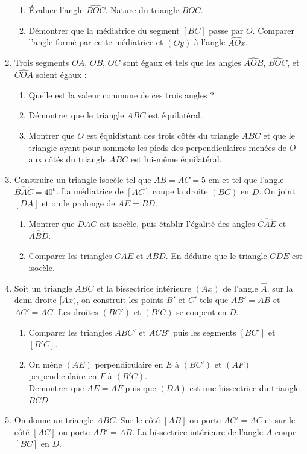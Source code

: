 \begin{enumerate}
\begin{enumerate}
 \item Évaluer l'angle $\widehat{BOC}$. Nature du triangle $BOC$.
 \item Démontrer que la médiatrice du segment $[BC]$ passe par $O$. Comparer l'angle
 formé par cette médiatrice et $(Oy)$ à l'angle $\widehat{AOx}$. 
 \end{enumerate}
 \item Trois segments $OA$, $OB$, $OC$ sont égaux et tels que les angles $\widehat{AOB}$, $\widehat{BOC}$, et $\widehat{COA}$ soient égaux :  \begin{enumerate}
 \item Quelle est la valeur commune de ces trois angles ? 
 \item Démontrer que le triangle $ABC$ est équilatéral. 
 \item Montrer que $O$ est équidistant des trois côtés du triangle $ABC$ et que
 le triangle ayant pour sommets les pieds des perpendiculaires menées de $O$ 
 aux côtés du triangle $ABC$ est lui-même équilatéral.
 \end{enumerate}
 \item Construire un triangle isocèle tel que $AB=AC=5$ cm et tel que l'angle
 $\widehat{BAC}=40^o$. La médiatrice de $[AC]$ coupe la droite $(BC)$ en $D$. On joint $[DA]$ et on le prolonge de $AE=BD$.\begin{enumerate}
 \item Montrer que $DAC$ est isocèle, puis établir l'égalité des angles $\widehat{CAE}$ et $\widehat{ABD}$. 
 \item Comparer les triangles $CAE$ et $ABD$. En déduire que le triangle $CDE$ est
 isocèle.
 \end{enumerate}
 \item Soit un triangle $ABC$ et la bissectrice intérieure $(Ax)$ de l'angle
 $\widehat{A}$. sur la demi-droite $[Ax)$, on construit les points $B'$ et $C'$ tels
 que $AB'=AB$ et $AC'=AC$. Les droites $(BC')$ et $(B'C)$ se coupent en $D$. \begin{enumerate}
 \item Comparer les triangles $ABC'$ et $ACB'$ puis les segments $[BC']$ et $[B'C]$.
 \item On mène $(AE)$ perpendiculaire en $E$ à $(BC')$ et $(AF)$ perpendiculaire en $F$ à $(B'C)$. \\ Demontrer que $AE=AF$ puis que $(DA)$ est une bissectrice du triangle $BCD$.
 \end{enumerate}
 \item On donne un triangle $ABC$. Sur le côté $[AB]$ on porte $AC'=AC$ et sur le côté $[AC]$ on porte $AB'=AB$. La bissectrice intérieure de l'angle $A$ coupe $[BC]$ en $D$.\begin{enumerate}

\end{enumerate}
\end{enumerate}
